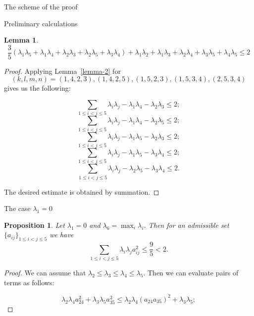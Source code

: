 \documentclass[12pt]{article}
\newtheorem{proposition}{Proposition}[section]
\newtheorem{lemma}{Lemma}[section]
\begin{document}
\begin{section}{The scheme of the proof}
\begin{section}{Preliminary calculations}
\begin{lemma}
        $$
           \frac{3}{5}(\lambda_{1}\lambda_{5} + \lambda_{1}\lambda_{4} +\lambda_{2}\lambda_{3} + \lambda_{2}\lambda_{5} + \lambda_{3}\lambda_{4} ) + \lambda_{1}\lambda_{2} + \lambda_{1}\lambda_{3} + \lambda_{2}\lambda_{4} +\lambda_{3}\lambda_{5} + \lambda_{4}\lambda_{5} \leq 2
        $$
    \end{lemma}

    \begin{proof}
        Applying Lemma~\ref{lemma-2} for $$(k,l,m,n) = (1,4,2,3),
        (1,4,2,5),(1,5,2,3), (1,5,3,4), (2,5,3,4)$$ gives us the following:

        $$
            \sum_{1\leq i<j\leq 5}\lambda_{i}\lambda_{j} - \lambda_{1}\lambda_{4} - \lambda_{2}\lambda_{3}\leq 2;
        $$
        $$
            \sum_{1\leq i<j\leq 5}\lambda_{i}\lambda_{j} - \lambda_{1}\lambda_{4} - \lambda_{2}\lambda_{5}\leq 2;
        $$
        $$
            \sum_{1\leq i<j\leq 5}\lambda_{i}\lambda_{j} - \lambda_{1}\lambda_{5} - \lambda_{2}\lambda_{3}\leq 2;
        $$
        $$
            \sum_{1\leq i<j\leq 5}\lambda_{i}\lambda_{j} - \lambda_{1}\lambda_{5} - \lambda_{3}\lambda_{4}\leq 2;
        $$
        $$
            \sum_{1\leq i<j\leq 5}\lambda_{i}\lambda_{j} - \lambda_{2}\lambda_{5} - \lambda_{3}\lambda_{4}\leq 2.
        $$

        The desired estimate is obtained by summation.
        
    \end{proof}
    
    
\end{section}



\begin{section}{The case  \texorpdfstring{$\lambda_{1} = 0$}{Lg}}
\label{s5}

\begin{proposition}
\label{lambda-zero-case}
    Let $  \lambda_{1}=0$ and $\lambda_{6} = \max_{i}\lambda_{i}$. Then for an admissible set $\{a_{ij}\}_{1\leq i<j\leq 5}$ we have
    $$
        \sum_{1\leq i < j\leq 5}\lambda_{i}\lambda_{j} a_{ij}^{2} \leq \frac{9}{5}<2.
    $$
\end{proposition}

\begin{proof}
    We can assume that $\lambda_{2}\leq \lambda_{3}\leq \lambda_{4} \leq \lambda_{5}.$  Then we can evaluate pairs of terms as follows:
    
    $$
        \lambda_{2}\lambda_{4}a_{24}^{2} + \lambda_{3}\lambda_{5}a_{35}^{2} \leq \lambda_{2}\lambda_{4}(a_{24}a_{35})^{2} + \lambda_{3}\lambda_{5};
    $$


\end{proof}
\end{section}
\end{section}
\end{document}
